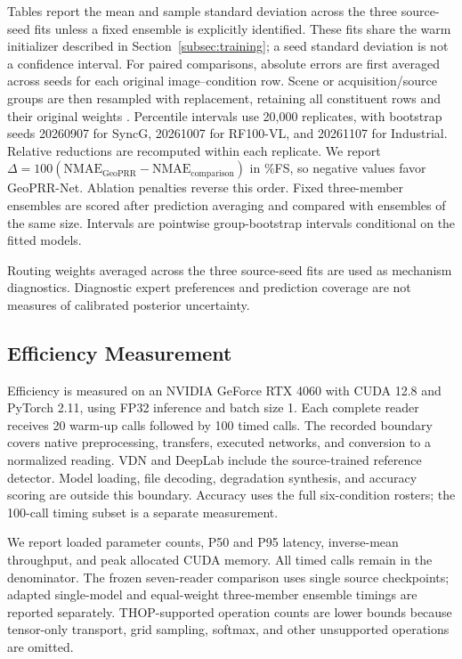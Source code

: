 \documentclass[electronics,article,submit,oneauthor]{Definitions/mdpi}
\newcommand{\modelname}{GeoPRR-Net\xspace}
\newcommand{\nmae}{\mathrm{NMAE}}
\begin{document}
Tables report the mean and sample standard deviation across the three source-seed fits unless a fixed ensemble is explicitly identified. These fits share the warm initializer described in Section~\ref{subsec:training}; a seed standard deviation is not a confidence interval. For paired comparisons, absolute errors are first averaged across seeds for each original image--condition row. Scene or acquisition/source groups are then resampled with replacement, retaining all constituent rows and their original weights \cite{davison1997bootstrap}. Percentile intervals use 20,000 replicates, with bootstrap seeds 20260907 for SyncG, 20261007 for RF100-VL, and 20261107 for Industrial. Relative reductions are recomputed within each replicate. We report $\Delta=100(\nmae_{\mathrm{GeoPRR}}-\nmae_{\mathrm{comparison}})$ in \%FS, so negative values favor \modelname. Ablation penalties reverse this order. Fixed three-member ensembles are scored after prediction averaging and compared with ensembles of the same size. Intervals are pointwise group-bootstrap intervals conditional on the fitted models.

Routing weights averaged across the three source-seed fits are used as mechanism diagnostics. Diagnostic expert preferences and prediction coverage are not measures of calibrated posterior uncertainty.

\subsection{Efficiency Measurement}
\label{subsec:efficiency_protocol}

Efficiency is measured on an NVIDIA GeForce RTX 4060 with CUDA 12.8 and PyTorch 2.11, using FP32 inference and batch size 1. Each complete reader receives 20 warm-up calls followed by 100 timed calls. The recorded boundary covers native preprocessing, transfers, executed networks, and conversion to a normalized reading. VDN and DeepLab include the source-trained reference detector. Model loading, file decoding, degradation synthesis, and accuracy scoring are outside this boundary. Accuracy uses the full six-condition rosters; the 100-call timing subset is a separate measurement.

We report loaded parameter counts, P50 and P95 latency, inverse-mean throughput, and peak allocated CUDA memory. All timed calls remain in the denominator. The frozen seven-reader comparison uses single source checkpoints; adapted single-model and equal-weight three-member ensemble timings are reported separately. THOP-supported operation counts are lower bounds because tensor-only transport, grid sampling, softmax, and other unsupported operations are omitted.
\end{document}

